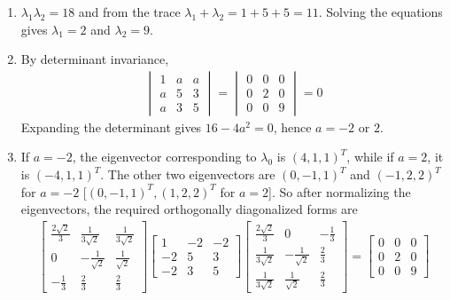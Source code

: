 \begin{Answer}
\begin{enumerate}[label=(\alph*)]
\item $\lambda_1\lambda_2 = 18$ and from the trace $\lambda_1 + \lambda_2 = 1 + 5 + 5 = 11$. Solving the equations gives $\lambda_1 = 2$ and $\lambda_2 = 9$.
\item By determinant invariance,
\begin{align*}
\begin{vmatrix}
1 & a & a\\
a & 5 & 3\\
a & 3 & 5
\end{vmatrix}
=
\begin{vmatrix}
0 & 0 & 0\\
0 & 2 & 0\\
0 & 0 & 9 
\end{vmatrix}
= 0
\end{align*}
Expanding the determinant gives $16 - 4a^2 = 0$, hence $a = -2$ or $2$.
\item If $a = -2$, the eigenvector corresponding to $\lambda_0$ is $(4,1,1)^T$, while if $a = 2$, it is $(-4,1,1)^T$. The other two eigenvectors are $(0,-1,1)^T$ and $(-1,2,2)^T$ for $a=-2$ [$(0,-1,1)^T, (1,2,2)^T$ for $a=2$]. So after normalizing the eigenvectors, the required orthogonally diagonalized forms are
\begin{align*}
\begin{bmatrix}
\frac{2\sqrt{2}}{3}&\frac{1}{3\sqrt{2}}&\frac{1}{3\sqrt{2}}\\ 
0&-\frac{1}{\sqrt{2}}&\frac{1}{\sqrt{2}}\\ 
-\frac{1}{3}&\frac{2}{3}&\frac{2}{3}
\end{bmatrix}
\begin{bmatrix}
1 & -2 & -2\\
-2 & 5 & 3\\
-2 & 3 & 5
\end{bmatrix}
\begin{bmatrix}
\frac{2\sqrt{2}}{3}&0&-\frac{1}{3}\\ 
\frac{1}{3\sqrt{2}}&-\frac{1}{\sqrt{2}}&\frac{2}{3}\\ 
\frac{1}{3\sqrt{2}}&\frac{1}{\sqrt{2}}&\frac{2}{3}
\end{bmatrix}
=
\begin{bmatrix}
0 & 0 & 0 \\
0 & 2 & 0 \\
0 & 0 & 9
\end{bmatrix}
\end{align*}

\end{enumerate}
\end{Answer}
